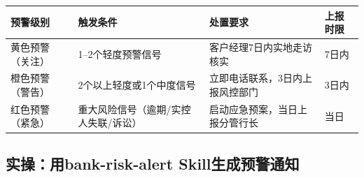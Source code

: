 \begin{table}[H]
\centering
\begin{tabular}{lp{3cm}p{4cm}p{4cm}}
\toprule
\textbf{预警级别} & \textbf{触发条件} & \textbf{处置要求} & \textbf{上报时限} \\
\midrule
黄色预警（关注） & 1--2个轻度预警信号 & 客户经理7日内实地走访核实 & 7日内 \\
橙色预警（警告） & 2个以上轻度或1个中度信号 & 立即电话联系，3日内上报风控部门 & 3日内 \\
红色预警（紧急） & 重大风险信号（逾期/实控人失联/诉讼） & 启动应急预案，当日上报分管行长 & 当日 \\
\bottomrule
\end{tabular}
\end{table}

\subsection{实操：用bank-risk-alert Skill生成预警通知}

